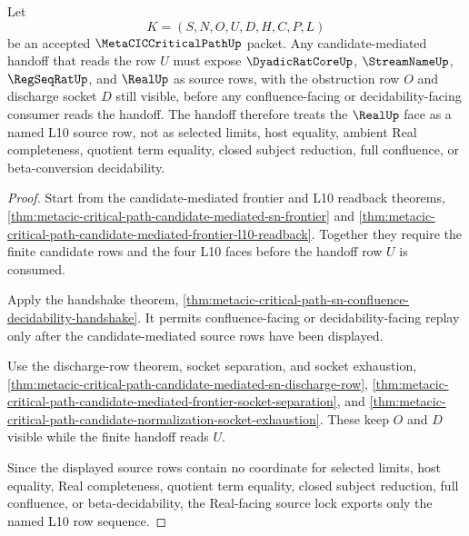 \begin{theorem}
\label{thm:metacic-critical-path-candidate-frontier-real-source-lock}
Let
$$
K=(S,N,O,U,D,H,C,P,L)
$$
be an accepted $\MetaCICCriticalPathUp$ packet. Any candidate-mediated handoff that reads the row $U$ must expose $\DyadicRatCoreUp$, $\StreamNameUp$, $\RegSeqRatUp$, and $\RealUp$ as source rows, with the obstruction row $O$ and discharge socket $D$ still visible, before any confluence-facing or decidability-facing consumer reads the handoff. The handoff therefore treats the $\RealUp$ face as a named L10 source row, not as selected limits, host equality, ambient Real completeness, quotient term equality, closed subject reduction, full confluence, or beta-conversion decidability.
\end{theorem}
\begin{proof}
Start from the candidate-mediated frontier and L10 readback theorems, \autoref{thm:metacic-critical-path-candidate-mediated-sn-frontier} and \autoref{thm:metacic-critical-path-candidate-mediated-frontier-l10-readback}. Together they require the finite candidate rows and the four L10 faces before the handoff row $U$ is consumed.

Apply the handshake theorem, \autoref{thm:metacic-critical-path-sn-confluence-decidability-handshake}. It permits confluence-facing or decidability-facing replay only after the candidate-mediated source rows have been displayed.

Use the discharge-row theorem, socket separation, and socket exhaustion, \autoref{thm:metacic-critical-path-candidate-mediated-sn-discharge-row}, \autoref{thm:metacic-critical-path-candidate-mediated-frontier-socket-separation}, and \autoref{thm:metacic-critical-path-candidate-normalization-socket-exhaustion}. These keep $O$ and $D$ visible while the finite handoff reads $U$.

Since the displayed source rows contain no coordinate for selected limits, host equality, Real completeness, quotient term equality, closed subject reduction, full confluence, or beta-decidability, the Real-facing source lock exports only the named L10 row sequence.
\end{proof}

